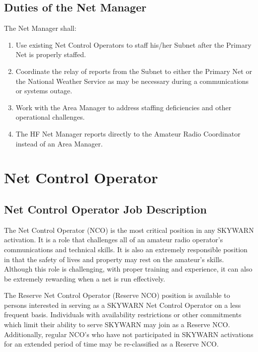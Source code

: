 \documentclass[pdflatex,letterpaper,twoside,12pt]{book}
\begin{document}
\subsection{Duties of the Net Manager}

The Net Manager shall:

\begin{enumerate}
\item Use existing Net Control Operators to staff his/her Subnet after the Primary Net is properly staffed.
\item Coordinate the relay of reports from the Subnet to either the Primary Net or the National Weather Service as may be necessary during a communications or systems outage.
\item Work with the Area Manager to address staffing deficiencies and other operational challenges.
\item The HF Net Manager reports directly to the Amateur Radio Coordinator instead of an Area Manager.
\end{enumerate}


\section{Net Control Operator}

\subsection{Net Control Operator Job Description}

The Net Control Operator (NCO) is the most critical position in any SKYWARN activation.  It is a role that challenges all of an amateur radio operator's communications and technical skills.  It is also an extremely responsible position in that the safety of lives and property may rest on the amateur's skills.  Although this role is challenging, with proper training and experience, it can also be extremely rewarding when a net is run effectively.

The Reserve Net Control Operator (Reserve NCO) position is available to persons interested in serving as a SKYWARN Net Control Operator on a less frequent basis.  Individuals with availability restrictions or other commitments which limit their ability to serve SKYWARN may join as a Reserve NCO.  Additionally, regular NCO's who have not participated in SKYWARN activations for an extended period of time may be re-classified as a Reserve NCO.
\end{document}
